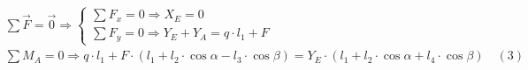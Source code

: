 \documentclass[preview]{standalone}
\begin{document}
\begin{align*}
\sum \Vec{F} = \Vec{0} \Longrightarrow \left\{\begin{array}{lc}\sum F_x = 0 \Longrightarrow X_E = 0 \\\sum F_y = 0 \Longrightarrow Y_E + Y_A = q\cdot l_1 + F \end{array}\right. \\ \sum M_A = 0 \Longrightarrow q\cdot l_1 + F\cdot (l_1+l_2\cdot \cos{\alpha}-l_3\cdot \cos{\beta}) = Y_E \cdot (l_1 + l_2\cdot\cos{\alpha} + l_4\cdot\cos{\beta}) \quad (3)
\end{align*}
\end{document}
